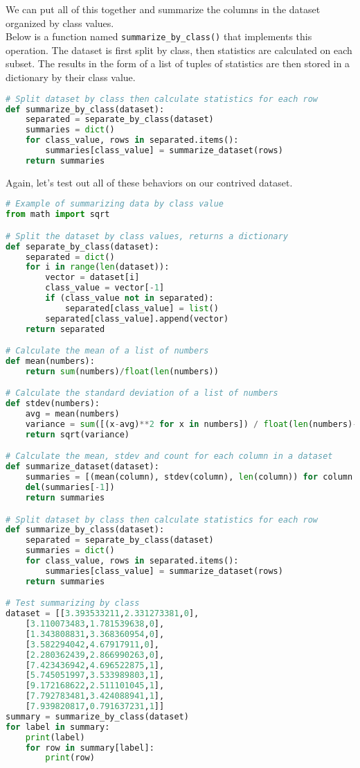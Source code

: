 \documentclass[12pt]{article}
\begin{document}
We can put all of this together and summarize the columns in the dataset organized by class values.\\

Below is a function named \verb|summarize_by_class()| that implements this operation. The dataset is first split by class, then statistics are calculated on each subset. The results in the form of a list of tuples of statistics are then stored in a dictionary by their class value.

\begin{lstlisting}[language=python]
# Split dataset by class then calculate statistics for each row
def summarize_by_class(dataset):
	separated = separate_by_class(dataset)
	summaries = dict()
	for class_value, rows in separated.items():
		summaries[class_value] = summarize_dataset(rows)
	return summaries

\end{lstlisting}

Again, let's test out all of these behaviors on our contrived dataset.

\begin{lstlisting}[language=python]
# Example of summarizing data by class value
from math import sqrt

# Split the dataset by class values, returns a dictionary
def separate_by_class(dataset):
	separated = dict()
	for i in range(len(dataset)):
		vector = dataset[i]
		class_value = vector[-1]
		if (class_value not in separated):
			separated[class_value] = list()
		separated[class_value].append(vector)
	return separated

# Calculate the mean of a list of numbers
def mean(numbers):
	return sum(numbers)/float(len(numbers))

# Calculate the standard deviation of a list of numbers
def stdev(numbers):
	avg = mean(numbers)
	variance = sum([(x-avg)**2 for x in numbers]) / float(len(numbers)-1)
	return sqrt(variance)

# Calculate the mean, stdev and count for each column in a dataset
def summarize_dataset(dataset):
	summaries = [(mean(column), stdev(column), len(column)) for column in zip(*dataset)]
	del(summaries[-1])
	return summaries

# Split dataset by class then calculate statistics for each row
def summarize_by_class(dataset):
	separated = separate_by_class(dataset)
	summaries = dict()
	for class_value, rows in separated.items():
		summaries[class_value] = summarize_dataset(rows)
	return summaries

# Test summarizing by class
dataset = [[3.393533211,2.331273381,0],
	[3.110073483,1.781539638,0],
	[1.343808831,3.368360954,0],
	[3.582294042,4.67917911,0],
	[2.280362439,2.866990263,0],
	[7.423436942,4.696522875,1],
	[5.745051997,3.533989803,1],
	[9.172168622,2.511101045,1],
	[7.792783481,3.424088941,1],
	[7.939820817,0.791637231,1]]
summary = summarize_by_class(dataset)
for label in summary:
	print(label)
	for row in summary[label]:
		print(row)

\end{lstlisting}
\end{document}
